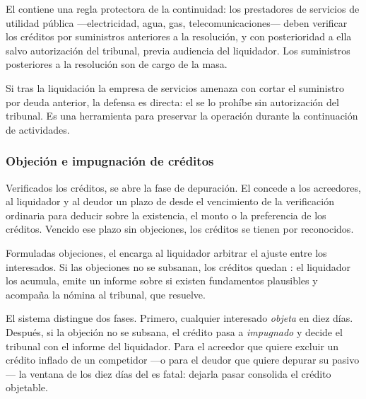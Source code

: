 El  contiene una regla protectora de la continuidad: los prestadores de servicios de
utilidad pública ---electricidad, agua, gas, telecomunicaciones--- deben verificar los créditos
por suministros anteriores a la resolución, y  con
posterioridad a ella salvo autorización del tribunal, previa audiencia del liquidador. Los
suministros posteriores a la resolución son de cargo de la masa.

\begin{practica}
Si tras la liquidación la empresa de servicios amenaza con cortar el suministro por deuda
anterior, la defensa es directa: el  se lo prohíbe sin autorización del tribunal. Es
una herramienta para preservar la operación durante la continuación de actividades.
\end{practica}

\subsubsection{Objeción e impugnación de créditos}

Verificados los créditos, se abre la fase de depuración. El  concede a los acreedores,
al liquidador y al deudor un plazo de  desde el vencimiento de la
verificación ordinaria para deducir  sobre la existencia, el monto o
la preferencia de los créditos. Vencido ese plazo sin objeciones, los créditos se tienen por
reconocidos.

Formuladas objeciones, el  encarga al liquidador arbitrar el ajuste entre los
interesados. Si las objeciones no se subsanan, los créditos quedan : el
liquidador los acumula, emite un informe sobre si existen fundamentos plausibles y acompaña la
nómina al tribunal, que resuelve.

\begin{foco}
El sistema distingue dos fases. Primero, cualquier interesado \emph{objeta} en diez días.
Después, si la objeción no se subsana, el crédito pasa a \emph{impugnado} y decide el tribunal
con el informe del liquidador. Para el acreedor que quiere excluir un crédito inflado de un
competidor ---o para el deudor que quiere depurar su pasivo--- la ventana de los diez días del
 es fatal: dejarla pasar consolida el crédito objetable.
\end{foco}

